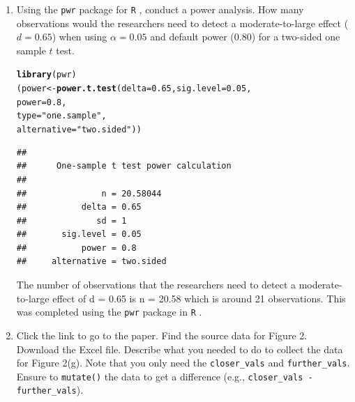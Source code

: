 \documentclass{article}\usepackage[]{graphicx}\usepackage[]{xcolor}
\makeatletter
\newcommand{\hlnum}[1]{\textcolor[rgb]{0.686,0.059,0.569}{#1}}%
\newcommand{\hlsng}[1]{\textcolor[rgb]{0.192,0.494,0.8}{#1}}%
\newcommand{\hldef}[1]{\textcolor[rgb]{0.345,0.345,0.345}{#1}}%
\newcommand{\hlkwb}[1]{\textcolor[rgb]{0.69,0.353,0.396}{#1}}%
\newcommand{\hlkwc}[1]{\textcolor[rgb]{0.333,0.667,0.333}{#1}}%
\newcommand{\hlkwd}[1]{\textcolor[rgb]{0.737,0.353,0.396}{\textbf{#1}}}%
\newenvironment{kframe}{%
 \def\at@end@of@kframe{}%
 \ifinner\ifhmode%
  \def\at@end@of@kframe{\end{minipage}}%
  \begin{minipage}{\columnwidth}%
 \fi\fi%
 \def\FrameCommand##1{\hskip\@totalleftmargin \hskip-\fboxsep
 \colorbox{shadecolor}{##1}\hskip-\fboxsep
     \hskip-\linewidth \hskip-\@totalleftmargin \hskip\columnwidth}%
 \MakeFramed {\advance\hsize-\width
   \@totalleftmargin\z@ \linewidth\hsize
   \@setminipage}}%
 {\par\unskip\endMakeFramed%
 \at@end@of@kframe}
\newenvironment{knitrout}{}{} %
\makeatother
\begin{document}
\begin{enumerate}
\item Using the \texttt{pwr} package for \texttt{R} \citep{pwr},
conduct a power analysis. How many observations would the researchers 
need to detect a moderate-to-large effect ($d=0.65$) when using 
$\alpha=0.05$ and default power (0.80) for a two-sided one sample 
$t$ test.
\begin{knitrout}
\color{fgcolor}\begin{kframe}
\begin{alltt}
\hlkwd{library}\hldef{(pwr)}
\hldef{(power} \hlkwb{<-} \hlkwd{power.t.test}\hldef{(}\hlkwc{delta} \hldef{=} \hlnum{0.65}\hldef{,} \hlkwc{sig.level} \hldef{=} \hlnum{0.05}\hldef{,}
             \hlkwc{power} \hldef{=} \hlnum{0.8}\hldef{,}
             \hlkwc{type} \hldef{=} \hlsng{"one.sample"}\hldef{,}
             \hlkwc{alternative} \hldef{=} \hlsng{"two.sided"}\hldef{))}
\end{alltt}
\begin{verbatim}
## 
##      One-sample t test power calculation 
## 
##               n = 20.58044
##           delta = 0.65
##              sd = 1
##       sig.level = 0.05
##           power = 0.8
##     alternative = two.sided
\end{verbatim}
\end{kframe}
\end{knitrout}
The number of observations that the researchers need to detect a moderate-to-large effect of d = 0.65 is n = 20.58 which is around 21 observations. This was completed using the \texttt{pwr} package in \texttt{R} \citep{pwr}.
\item Click the link to go to the paper. Find the source data for 
Figure 2. Download the Excel file. Describe what you needed to
do to collect the data for Figure 2(g). Note that you only need the 
\texttt{closer\_vals} and \texttt{further\_vals}. Ensure to 
\texttt{mutate()} the data to get a difference 
(e.g., \texttt{closer\_vals - further\_vals}).
\begin{knitrout}
\color{fgcolor}\begin{kframe}
\begin{alltt}

\end{alltt}
\end{kframe}
\end{knitrout}
\end{enumerate}
\end{document}

